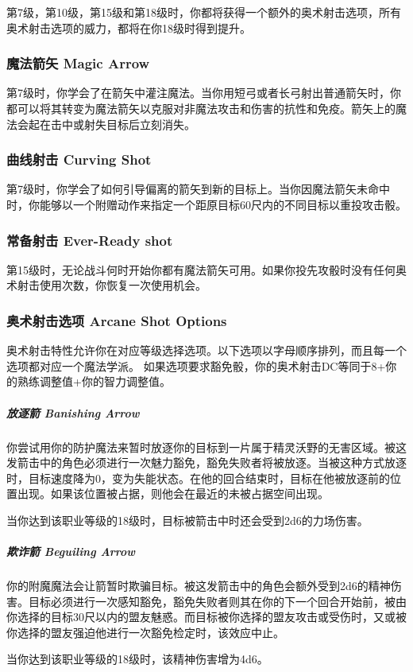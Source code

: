 第7级，第10级，第15级和第18级时，你都将获得一个额外的奥术射击选项，所有奥术射击选项的威力，都将在你18级时得到提升。

\subsubsection{魔法箭矢 Magic Arrow}
第7级时，你学会了在箭矢中灌注魔法。当你用短弓或者长弓射出普通箭矢时，你都可以将其转变为魔法箭矢以克服对非魔法攻击和伤害的抗性和免疫。箭矢上的魔法会起在击中或射失目标后立刻消失。

\subsubsection{曲线射击 Curving Shot}
第7级时，你学会了如何引导偏离的箭矢到新的目标上。当你因魔法箭矢未命中时，你能够以一个附赠动作来指定一个距原目标60尺内的不同目标以重投攻击骰。

\subsubsection{常备射击 Ever-Ready shot}第15级时，无论战斗何时开始你都有魔法箭矢可用。如果你投先攻骰时没有任何奥术射击使用次数，你恢复一次使用机会。

\subsubsection{奥术射击选项 Arcane Shot Options}奥术射击特性允许你在对应等级选择选项。以下选项以字母顺序排列，而且每一个选项都对应一个魔法学派。
如果选项要求豁免骰，你的奥术射击DC等同于8+你的熟练调整值+你的智力调整值。

\subparagraph{放逐箭 Banishing Arrow}你尝试用你的防护魔法来暂时放逐你的目标到一片属于精灵沃野的无害区域。被这发箭击中的角色必须进行一次魅力豁免，豁免失败者将被放逐。当被这种方式放逐时，目标速度降为0，变为失能状态。在他的回合结束时，目标在他被放逐前的位置出现。如果该位置被占据，则他会在最近的未被占据空间出现。

当你达到该职业等级的18级时，目标被箭击中时还会受到2d6的力场伤害。

\subparagraph{欺诈箭 Beguiling Arrow}你的附魔魔法会让箭暂时欺骗目标。被这发箭击中的角色会额外受到2d6的精神伤害。目标必须进行一次感知豁免，豁免失败者则其在你的下一个回合开始前，被由你选择的目标30尺以内的盟友魅惑。而目标被你选择的盟友攻击或受伤时，又或被你选择的盟友强迫他进行一次豁免检定时，该效应中止。

当你达到该职业等级的18级时，该精神伤害增为4d6。

